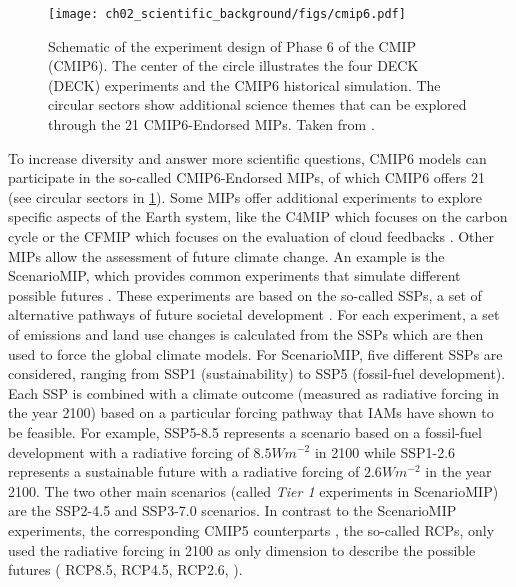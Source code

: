 \begin{figure}[t]
  \centering
  \texttt{[image: 
    ch02\_scientific\_background/figs/cmip6.pdf]}
  \caption{Schematic of the experiment design of Phase 6 of the \acl{CMIP}
    (\acs{CMIP}6). The center of the circle illustrates the four \acs{DECK}
    (\acl{DECK}) experiments and the \acs{CMIP}6 historical simulation. The
    circular sectors show additional science themes that can be explored
    through the 21 \acs{CMIP}6-Endorsed \acfp{MIP}. Taken from
    \textcite{Simpkins2017}.}
  \label{fig:02:cmip6}
\end{figure}

To increase diversity and answer more scientific questions, \acs{CMIP}6 models
can participate in the so-called \acs{CMIP}6-Endorsed \acp{MIP}, of which
\acs{CMIP}6 offers 21 (see circular sectors in \cref{fig:02:cmip6}). Some
\acp{MIP} offer additional experiments to explore specific aspects of the Earth
system, like the \ac{C4MIP} which focuses on the carbon cycle
\autocite{Jones2016} or the \ac{CFMIP} which focuses on the evaluation of cloud
feedbacks \autocite{Webb2017}. Other \acp{MIP} allow the assessment of future
climate change. An example is the \ac{ScenarioMIP}, which provides common
experiments that simulate different possible futures \autocite{ONeill2016}.
These experiments are based on the so-called \acp{SSP}, a set of alternative
pathways of future societal development \autocite{ONeill2013, ONeill2017}. For
each experiment, a set of emissions and land use changes is calculated from the
\acp{SSP} \autocite{Riahi2017} which are then used to force the global climate
models. For \ac{ScenarioMIP}, five different \acp{SSP} are considered, ranging
from \ac{SSP}1 (sustainability) to \ac{SSP}5 (fossil-fuel development). Each
\ac{SSP} is combined with a climate outcome (measured as radiative forcing in
the year 2100) based on a particular forcing pathway that \acp{IAM} have shown
to be feasible. For example, \ac{SSP}5-8.5 represents a scenario based on a
fossil-fuel development with a radiative forcing of $8.5 \unit{W m^{-2}}$ in
2100 while \ac{SSP}1-2.6 represents a sustainable future with a radiative
forcing of $2.6 \unit{W m^{-2}}$ in the year 2100. The two other main scenarios
(called \emph{Tier 1} experiments in \ac{ScenarioMIP}) are the \ac{SSP}2-4.5
and \ac{SSP}3-7.0 scenarios. In contrast to the \ac{ScenarioMIP} experiments,
the corresponding \acs{CMIP}5 counterparts \autocite{Taylor2012}, the so-called
\acp{RCP}, only used the radiative forcing in 2100 as only dimension to
describe the possible futures (\eg{} \ac{RCP}8.5, \ac{RCP}4.5, \ac{RCP}2.6,
\etc{}).

